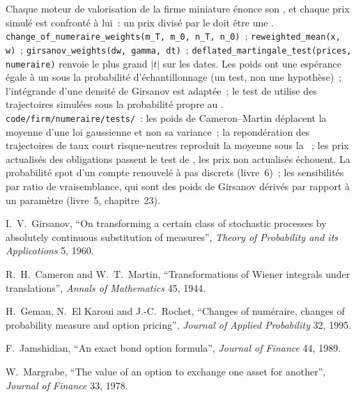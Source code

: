 \begin{build}
 Chaque moteur de valorisation de la firme miniature énonce son , et chaque
prix simulé est confronté à lui~: un prix divisé par le  doit être une .
 \texttt{change\_of\_numeraire\_weights(m\_T, m\_0, n\_T, n\_0)}~;
\texttt{reweighted\_mean(x, w)}~; \texttt{girsanov\_weights(dw, gamma, dt)}~;
\texttt{deflated\_martingale\_test(prices, numeraire)} renvoie le plus grand $|t|$ sur les dates.
 Les poids ont une espérance égale à un sous la probabilité d'échantillonnage (un test, non une hypothèse)~;
l'intégrande d'une densité de Girsanov est adaptée~; le test de  utilise des trajectoires simulées sous
la probabilité propre au .
 \texttt{code/firm/numeraire/tests/}~: les poids de Cameron--Martin déplacent la
moyenne d'une loi gaussienne et non sa variance~; la repondération des trajectoires de taux court risque-neutres reproduit la
moyenne sous la ~; les prix actualisés des obligations passent le test de , les prix non actualisés échouent.
 La probabilité spot d'un compte renouvelé à pas discrets (livre~6)~; les sensibilités par ratio de vraisemblance,
qui sont des poids de Girsanov dérivés par rapport à un paramètre (livre~5,
chapitre~23).
\end{build}

\begin{omsources}
\item I.~V.~Girsanov, ``On transforming a certain class of stochastic processes by absolutely
continuous substitution of measures'', \emph{Theory of Probability and its Applications} 5, 1960.
\item R.~H.~Cameron and W.~T.~Martin, ``Transformations of Wiener integrals under translations'',
\emph{Annals of Mathematics} 45, 1944.
\item H.~Geman, N.~El Karoui and J.-C.~Rochet, ``Changes of numéraire, changes of probability
measure and option pricing'', \emph{Journal of Applied Probability} 32, 1995.
\item F.~Jamshidian, ``An exact bond option formula'', \emph{Journal of Finance} 44, 1989.
\item W.~Margrabe, ``The value of an option to exchange one asset for another'', \emph{Journal of
Finance} 33, 1978.
\end{omsources}

